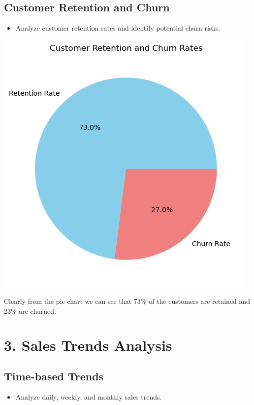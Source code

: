 \documentclass{article}
\begin{document}
    \subsection{Customer Retention and Churn}
    \begin{itemize}
        \item Analyze customer retention rates and identify potential churn risks.
    \end{itemize}
    \begin{tcolorbox}[colback=blue!5!white, colframe=green!70!black, title= Customer Retention and Churn Rate , fonttitle=\bfseries\Large]
        \begin{center}
            \includegraphics[width=1\columnwidth]{images/crc.png}
        \end{center}
        Clearly from the pie chart we can see that 73\% of the customers are retained and 23\% are churned.\\
    \end{tcolorbox}

\section{3. Sales Trends Analysis}
    \subsection{Time-based Trends}
    \begin{itemize}
        \item Analyze daily, weekly, and monthly sales trends.
    \end{itemize}
   
\end{document}
